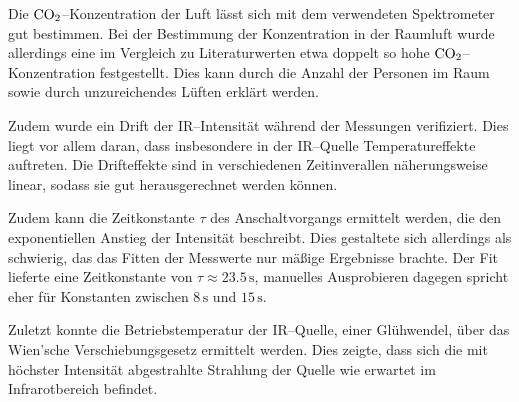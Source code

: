 \documentclass[12pt,a4paper]{scrartcl}
\numberwithin{equation}{section} %
\begin{document}
Die $\ce{CO_2}$--Konzentration der Luft lässt sich mit dem verwendeten Spektrometer gut bestimmen. Bei der Bestimmung der Konzentration in der Raumluft wurde allerdings eine im Vergleich zu Literaturwerten etwa doppelt so hohe $\ce{CO_2}$--Konzentration festgestellt. Dies kann durch die Anzahl der Personen im Raum sowie durch unzureichendes Lüften erklärt werden.

Zudem wurde ein Drift der IR--Intensität während der Messungen verifiziert. Dies liegt vor allem daran, dass insbesondere in der IR--Quelle Temperatureffekte auftreten. Die Drifteffekte sind in verschiedenen Zeitinverallen näherungsweise linear, sodass sie gut herausgerechnet werden können.

Zudem kann die Zeitkonstante $\tau$ des Anschaltvorgangs ermittelt werden, die den exponentiellen Anstieg der Intensität beschreibt. Dies gestaltete sich allerdings als schwierig, das das Fitten der Messwerte nur mäßige Ergebnisse brachte. Der Fit lieferte eine Zeitkonstante von $\tau\approx23.5\mathrm{\,s}$, manuelles Ausprobieren dagegen spricht eher für Konstanten zwischen $8\mathrm{\,s}$ und $15\mathrm{\,s}$.

Zuletzt konnte die Betriebstemperatur der IR--Quelle, einer Glühwendel, über das Wien'sche Verschiebungsgesetz ermittelt werden. Dies zeigte, dass sich die mit höchster Intensität abgestrahlte Strahlung der Quelle wie erwartet im Infrarotbereich befindet.
\end{document}
